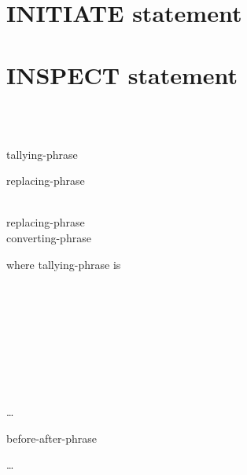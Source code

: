 \section{INITIATE statement}

\section{INSPECT statement}

\begin{1=}
  \identifier \\
  \literal \\
  \functionname
\end{1=}
\begin{1=}
  tallying-phrase
  \begin{0-1}
    replacing-phrase
  \end{0-1} \\

  replacing-phrase \\
  converting-phrase
\end{1=}

where tallying-phrase is

\begin{1=}
  \begin{1=}
    \begin{1=}
      \identifier \\
      \literal
    \end{1=}
    \begin{1=}
       \\

      \begin{1=}
         \\
         \\
      \end{1=}
      \begin{1=}
        \identifier \\
        \literal
      \end{1=}
    \end{1=}
  \end{1=}\ldots
  \begin{0-1}
    before-after-phrase
  \end{0-1}
\end{1=} \ldots

